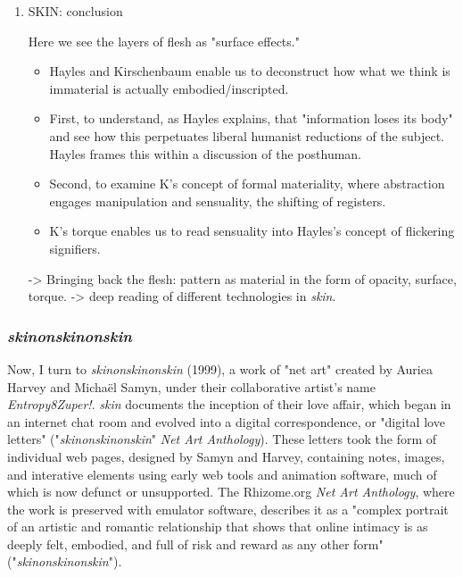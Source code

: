\documentclass[11pt]{article}
\begin{document}
\begin{enumerate}
\item SKIN: conclusion
\label{sec:org0880448}

Here we see the layers of flesh as "surface effects." 
\begin{itemize}
\item Hayles and Kirschenbaum enable us to deconstruct how what we think
is immaterial is actually embodied/inscripted.
\item First, to understand, as Hayles explains, that "information loses
its body" and see how this perpetuates liberal humanist reductions
of the subject. Hayles frames this within a discussion of the
posthuman.
\item Second, to examine K's concept of formal materiality, where
abstraction engages manipulation and sensuality, the shifting of
registers.
\item K's torque enables us to read sensuality into Hayles's concept of
flickering signifiers.
\end{itemize}

-> Bringing back the flesh: pattern as material in the form of opacity,
  surface, torque.
-> deep reading of different technologies in \emph{skin}.
\end{enumerate}

\subsubsection{\emph{skinonskinonskin}}
\label{sec:orgd043432}
Now, I turn to \emph{skinonskinonskin} (1999), a work of "net art" created
by Auriea Harvey and Michaël Samyn, under their collaborative artist's
name \emph{Entropy8Zuper!}. \emph{skin} documents the inception of their love
affair, which began in an internet chat room and evolved into a
digital correspondence, or "digital love letters"
("\emph{skinonskinonskin}" \emph{Net Art Anthology}). These letters took the
form of individual web pages, designed by Samyn and Harvey, containing
notes, images, and interative elements using early web tools and
animation software, much of which is now defunct or unsupported. The
Rhizome.org \emph{Net Art Anthology}, where the work is preserved with
emulator software, describes it as a "complex portrait of an artistic
and romantic relationship that shows that online intimacy is as deeply
felt, embodied, and full of risk and reward as any other form"
("\emph{skinonskinonskin}").
\end{document}

